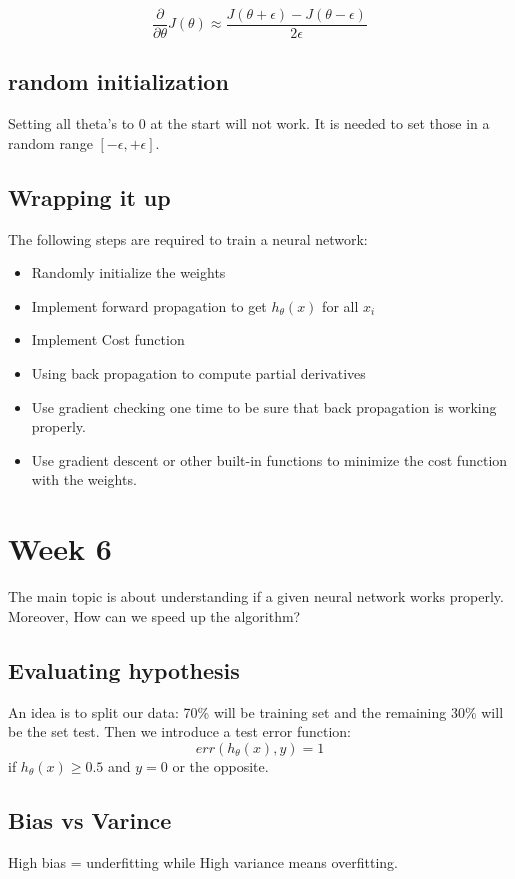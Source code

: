 \documentclass{article}
\begin{document}
$$\frac{\partial}{\partial \theta}J(\theta) \approx \frac{J(\theta + \epsilon)
- J(\theta - \epsilon)}{2\epsilon} $$

\subsection{random initialization}
Setting all theta's to 0 at the start will not work. It is needed to set those
in a random range $[-\epsilon,+\epsilon]$.
\subsection{Wrapping it up}
The following steps are required to train a neural network:
\begin{itemize}
  \item Randomly initialize the weights
  \item Implement forward propagation to get $h_\theta(x)$ for all $x_i$
  \item Implement Cost function
  \item Using back propagation to compute partial derivatives
  \item Use gradient checking one time to be sure that back propagation
        is working properly.
  \item Use gradient descent or other built-in functions to minimize the cost
        function with the weights.


\end{itemize}

\section{Week 6}
The main topic is about understanding if a given neural network works properly.
Moreover, How can we speed up the algorithm?

\subsection{Evaluating hypothesis}
An idea is to split our data: 70\% will be training set and the remaining 30\%
will be the set test. Then we introduce a test error function:
$$err(h_\theta(x),y) = 1 $$ if $h_\theta(x) \geq 0.5$ and $y = 0$ or the opposite.

\subsection{Bias vs Varince}
High bias = underfitting while High variance means overfitting. \\
\end{document}
